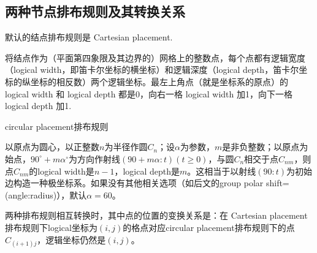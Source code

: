 \documentclass[UTF8]{ctexart}
\begin{document}




\subsection{两种节点排布规则及其转换关系}

默认的结点排布规则是 Cartesian placement.

将结点作为（平面第四象限及其边界的）网格上的整数点，每个点都有逻辑宽度（logical width，即笛卡尔坐标的横坐标）和逻辑深度（logical depth，笛卡尔坐标的纵坐标的相反数）两个逻辑坐标。最左上角点（就是坐标系的原点）的 logical width 和 logical depth 都是0，向右一格 logical width 加1，向下一格logical depth 加1.

circular placement排布规则

以原点为圆心，以正整数$n$为半径作圆$C_n$；设$\alpha$为参数，$m$是非负整数；以原点为始点，$90^{\circ} + m \alpha^{\circ}$为方向作射线$(90 + m \alpha:t)(t\geqslant0)$，与圆$C_n$相交于点$C_{nm}$，则点$C_{nm}$的logical width是$n-1$，logical depth是$m$。这相当于以射线$(90 : t)$为初始边构造一种极坐标系。如果没有其他相关选项（如后文的group polar shift=(angle:radius)），默认$\alpha=60$。

两种排布规则相互转换时，其中点的位置的变换关系是：在 Cartesian placement排布规则下logical坐标为$(i,j)$的格点对应circular placement排布规则下的点$C_{(i+1)j}$，逻辑坐标仍然是$(i,j)$。
\end{document}
